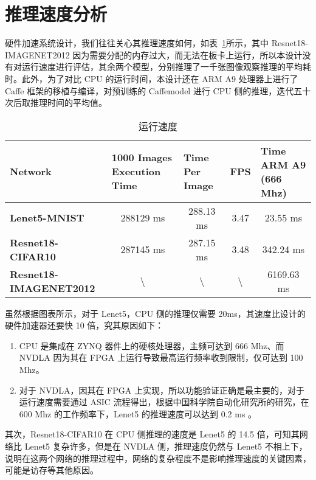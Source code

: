 \section{推理速度分析}

硬件加速系统设计，我们往往关心其推理速度如何，如表~\ref{tab:Execution Time}所示，其中 Resnet18-IMAGENET2012 因为需要分配的内存过大，而无法在板卡上运行，所以本设计没有对运行速度进行评估，其余两个模型，分别推理了一千张图像观察推理的平均耗时。此外，为了对比 CPU 的运行时间，本设计还在 ARM A9 处理器上进行了 Caffe 框架的移植与编译，对预训练的 Caffemodel 进行 CPU 侧的推理，迭代五十次后取推理时间的平均值。

\begin{table}[!htbp]
    \caption{运行速度}
    \label{tab:Execution Time}
    \centering
    \footnotesize%
    \setlength{\tabcolsep}{4pt}%
    \renewcommand{\arraystretch}{1.2}%
    \begin{tabular}{lcccc}
        \toprule
        \textbf{Network}                                   & \multicolumn{1}{l}{\textbf{1000 Images Execution Time}} & \multicolumn{1}{l}{\textbf{Time Per Image}} & \textbf{FPS}     & \multicolumn{1}{l}{\textbf{Time ARM A9 (666 Mhz)}} \\
        \midrule
        \textbf{Lenet5-MNIST}          & 288129 ms                                               & 288.13 ms                                   & 3.47             & 23.55 ms                                            \\
        \textbf{Resnet18-CIFAR10}      & 287145 ms                                               & 287.15 ms                                   & 3.48             & 342.24 ms                                          \\
        \textbf{Resnet18-IMAGENET2012} & \textbackslash{}                                        & \textbackslash{}                            & \textbackslash{} & 6169.63 ms                                         \\
        \bottomrule                   
    \end{tabular}
\end{table}

虽然根据图表所示，对于 Lenet5，CPU 侧的推理仅需要 20ms，其速度比设计的硬件加速器还要快 10 倍，究其原因如下：

\begin{enumerate}
    \item CPU 是集成在 ZYNQ 器件上的硬核处理器，主频可达到 666 Mhz、而 NVDLA 因为其在 FPGA 上运行导致最高运行频率收到限制，仅可达到 100 Mhz。
    \item 对于 NVDLA，因其在 FPGA 上实现，所以功能验证正确是最主要的，对于运行速度需要通过 ASIC 流程得出，根据中国科学院自动化研究所的研究，在 600 Mhz 的工作频率下，Lenet5 的推理速度可以达到 0.2 ms \cite{9040769}。 
\end{enumerate}

其次，Resnet18-CIFAR10 在 CPU 侧推理的速度是 Lenet5 的 14.5 倍，可知其网络比 Lenet5 复杂许多，但是在 NVDLA 侧，推理速度仍然与 Lenet5 不相上下，说明在这两个网络的推理过程中，网络的复杂程度不是影响推理速度的关键因素，可能是访存等其他原因。